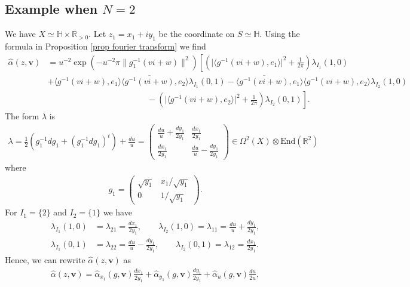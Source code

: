\documentclass[twoside,a4paper,10pt]{article} %
\newcommand{\alphahat}{\widehat{\alpha}}
\newcommand{\8}{\infty}
\newcommand{\vbf}{\mathbf{v}}
\newcommand{\HH}{\mathbb{H}}
\newcommand{\R}{\mathbb{R}}
\newcommand{\End}{\mathrm{End}}
\theoremstyle{mytheoremstyle}
\theoremstyle{remark}
\numberwithin{equation}{section}
\begin{document}
\subsection{Example when $N=2$} \label{example lambda} We have $X \simeq \HH \times \R_{>0}$. Let $z_1=x_1+iy_1$ be the coordinate on $S \simeq \HH$. Using the formula in Proposition \ref{prop fourier transform} we find
 \begin{align}
\alphahat(z,\vbf) & =u^{-2}\exp \left (-u^{-2}\pi \lVert g_1^{-1}(vi+w) \rVert^2 \right ) \left [ \left ( \vert \langle g^{-1}(vi+w),e_1\rangle \vert ^2+\frac{1}{2\pi}\right ) \lambda_{I_1}(1,0) \right .  \\
& + \langle g^{-1}(vi+w),e_1\rangle \langle \overline{g^{-1}(vi+w)},e_2\rangle  \lambda_{I_1}(0,1) -  \langle \overline{g^{-1}(vi+w)},e_1\rangle \langle g^{-1}(vi+w),e_2\rangle   \lambda_{I_2}(1,0) \\
& \hspace{5cm}-\left . \left ( \vert \langle g^{-1}(vi+w),e_2\rangle \vert ^2+\frac{1}{2\pi}\right ) \lambda_{I_2}(0,1) \right ].
\end{align}
The form $\lambda$ is
\begin{align}
\lambda = \frac{1}{2} \left (g_1^{-1}dg_1+(g_1^{-1}dg_1)^t \right )+\frac{du}{u}=\begin{pmatrix}
\frac{du}{u} + \frac{dy_1}{2y_1}& \frac{dx_1}{2y_1} \\ \frac{dx_1}{2y_1} &\frac{du}{u} - \frac{dy_1}{2y_1} \end{pmatrix} \in \Omega^2(X) \otimes \End(\R^2)
\end{align}
where
\begin{align}
g_1=\begin{pmatrix}
\sqrt{y_1} & x_1/\sqrt{y_1} \\ 0 & 1/\sqrt{y_1}
\end{pmatrix}.
\end{align} For $I_1=\{2\}$ and $I_2=\{1\}$ we have
\begin{align}
\lambda_{I_1}(1,0) &=\lambda_{21}= \frac{dx_1}{2y_1}, \qquad \lambda_{I_2}(1,0)=\lambda_{11}=\frac{du}{u} + \frac{dy_1}{2y_1} ,\\
\lambda_{I_1}(0,1)&=\lambda_{22}=\frac{du}{u} - \frac{dy_1}{2y_1}, \qquad \lambda_{I_2}(0,1)=\lambda_{12}=\frac{dx_1}{2y_1}.
\end{align}
Hence, we can rewrite $\alphahat(z,\vbf)$ as
\begin{align}
\alphahat(z,\vbf)=\alphahat_{x_1}(g,\vbf)\frac{dx_1}{2y_1} +\alphahat_{y_1}(g,\vbf)\frac{dy_1}{2y_1}+\alphahat_{u}(g,\vbf)\frac{du}{2u},
\end{align}
\end{document}
